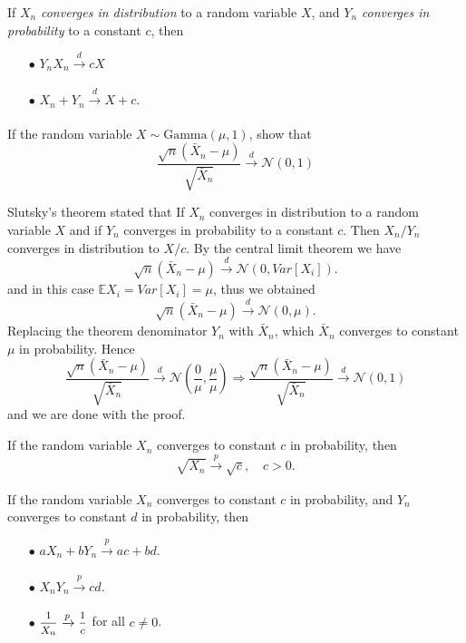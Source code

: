 \begin{theorem}
    If $X_n$ \textit{converges in distribution} to a random variable $X$, and $Y_n$ \textit{converges in probability} to a constant $c$, then 
    \begin{itemize}
        \item[$\bullet$] $Y_nX_n \xrightarrow[]{d} cX$
        \item[$\bullet$] $X_n + Y_n \xrightarrow[]{d} X + c$.
    \end{itemize}
\end{theorem}

\begin{example}
    If the random variable $X \sim \text{Gamma}(\mu, 1)$, show that 
    \[
        \frac{\sqrt{n}(\bar{X}_n - \mu)}{\sqrt{\bar{X}_n}} \xrightarrow[]{d} \mathcal{N}(0,1)
    \]
\end{example}
\begin{solution}
    Slutsky's theorem stated that If $X_n$ converges in distribution to a random variable 
    $X$ and if $Y_n$ converges in probability to a constant $c$. Then $X_n / Y_n$
    converges in distribution to $X/c$. By the central limit theorem we have 
    \[
        \sqrt{n}(\bar{X}_n - \mu) \xrightarrow[]{d} \mathcal{N}(0, Var[X_i]).
    \]
    and in this case $\mathbb{E}X_i = Var[X_i] = \mu$, thus we obtained
    \[
        \sqrt{n}(\bar{X}_n - \mu) \xrightarrow[]{d} \mathcal{N}(0, \mu).
    \]
    Replacing the theorem denominator $Y_n$ with $\bar{X}_n$, which $\bar{X}_n$ converges to constant $\mu$ 
    in probability. Hence
    \[
        \frac{\sqrt{n}(\bar{X}_n - \mu)}{\sqrt{\bar{X}_n}} \xrightarrow[]{d} \mathcal{N}\left(\frac{0}{\mu}, \frac{\mu}{\mu}\right)
        \Longrightarrow \frac{\sqrt{n}(\bar{X}_n - \mu)}{\sqrt{\bar{X}_n}} \xrightarrow[]{d} \mathcal{N}(0,1)
    \]
    and we are done with the proof.
\end{solution}

\begin{theorem}
    If the random variable $X_n$ converges to constant $c$ in probability, then 
    \begin{equation}
        \sqrt{X_n} \xrightarrow[]{p} \sqrt{c},\quad c > 0. 
    \end{equation}
\end{theorem}

\begin{theorem}
    If the random variable $X_n$ converges to constant $c$ in probability, and 
    $Y_n$ converges to constant $d$ in probability, then 
    \begin{itemize}
        \item[$\bullet$] $aX_n + bY_n \xrightarrow[]{p} ac + bd$.
        \item[$\bullet$] $X_n Y_n \xrightarrow[]{p} cd$.
        \item[$\bullet$] $\mfrac{1}{X_n} \xrightarrow[]{p} \mfrac{1}{c}$ for all $c \neq 0$.
    \end{itemize}
\end{theorem}

